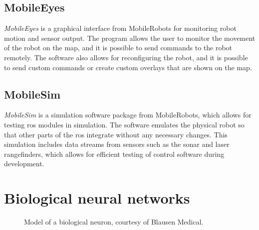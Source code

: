 \documentclass[\rootfolder/main.tex]{subfiles}
\begin{document}

\subsection{MobileEyes}

\emph{MobileEyes} is a graphical interface from MobileRobots for monitoring robot motion and sensor output.
The program allows the user to monitor the movement of the robot on the map, and it is possible to send commands to the robot remotely.
The software also allows for reconfiguring the robot, and it is possible to send custom commands or create custom overlays that are shown on the map.


\subsection{MobileSim}

\emph{MobileSim} is a simulation software package from MobileRobots, which allows for testing \acrshort{ros} modules in simulation.
The software emulates the physical robot so that other parts of the \acrshort{ros} integrate without any necessary changes.
This simulation includes data streams from sensors such as the sonar and laser rangefinders, which allows for efficient testing of control software during development.


\section{Biological neural networks}

\begin{figure}
    \caption[Model of a biological neuron]{Model of a biological neuron, courtesy of Blausen Medical.\label{fig:biological_neuron}}
\end{figure}
\end{document}

